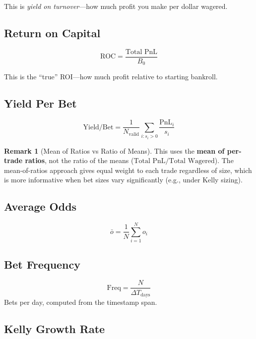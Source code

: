 \documentclass[12pt,a4paper]{report}
\theoremstyle{definition}
\newtheorem{remark}{Remark}[chapter]
\newcommand{\pnl}{\text{PnL}}
\begin{document}
This is \emph{yield on turnover}—how much profit you make per dollar wagered.

\subsection{Return on Capital}
\begin{equation}
    \text{ROC} = \frac{\text{Total PnL}}{B_0}
\end{equation}

This is the ``true'' ROI—how much profit relative to starting bankroll.

\subsection{Yield Per Bet}
\begin{equation}
    \text{Yield/Bet} = \frac{1}{N_{\text{valid}}} \sum_{i : s_i > 0} \frac{\pnl_i}{s_i}
    \label{eq:yield-per-bet}
\end{equation}

\begin{remark}[Mean of Ratios vs Ratio of Means]
This uses the \textbf{mean of per-trade ratios}, not the ratio of the means ($\text{Total PnL} / \text{Total Wagered}$). The mean-of-ratios approach gives equal weight to each trade regardless of size, which is more informative when bet sizes vary significantly (e.g., under Kelly sizing).
\end{remark}

\subsection{Average Odds}
\begin{equation}
    \bar{o} = \frac{1}{N} \sum_{i=1}^{N} o_i
\end{equation}

\subsection{Bet Frequency}
\begin{equation}
    \text{Freq} = \frac{N}{\Delta T_{\text{days}}}
\end{equation}
Bets per day, computed from the timestamp span.

\subsection{Kelly Growth Rate}
\label{sec:kelly-growth}
\end{document}
